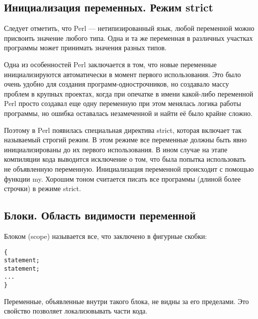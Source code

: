\subsection{Инициализация переменных. Режим strict}
Следует отметить, что Perl --- нетипизированный язык, любой переменной можно присвоить значение любого типа. Одна и та же переменная в различных участках программы может принимать значения разных типов.

Одна из особенностей Perl заключается в том, что новые переменные инициализируются автоматически в момент первого использования. Это было очень удобно для создания программ-однострочников, но создавало массу проблем в крупных проектах, когда при опечатке в имени какой-либо переменной Perl просто создавал еще одну переменную при этом менялась логика работы программы, но ошибка оставалась незамеченной и найти её было крайне сложно.

Поэтому в Perl появилась специальная директива strict, которая включает так называемый строгий режим. В этом режиме все переменные должны быть явно инициализированы до их первого использования. В ином случае на этапе компиляции кода выводится исключение о том, что была попытка использовать не объявленную переменную. Инициализация переменной происходит с помощью функции my. Хорошим тоном считается писать все программы (длиной более строчки) в режиме strict.

\subsection{Блоки. Область видимости переменной}
Блоком (scope) называется все, что заключено в фигурные скобки:
\begin{verbatim}
{
statement;
statement;
...
}
\end{verbatim}
Переменные, объявленные внутри такого блока, не видны за его пределами. Это свойство позволяет локализовывать части кода.


